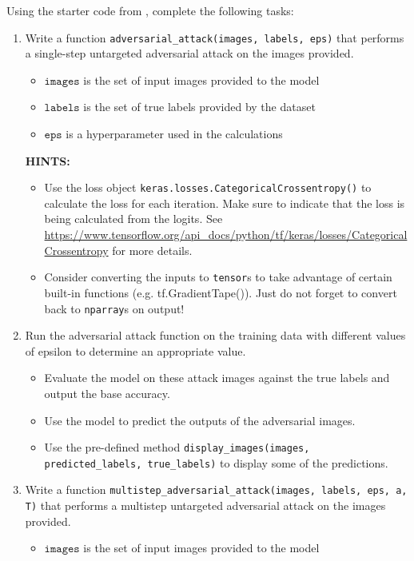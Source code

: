 \documentclass{article}
\begin{document}
Using the starter code from , complete the following tasks:
\begin{enumerate}
    \item Write a function \texttt{adversarial\_attack(images, labels, eps)} that performs a single-step untargeted adversarial attack on the images provided.
    \begin{itemize}
        \item $\texttt{images}$ is the set of input images provided to the model
        \item $\texttt{labels}$ is the set of true labels provided by the dataset
        \item $\texttt{eps}$ is a hyperparameter used in the calculations
    \end{itemize}
    \textbf{HINTS:}
    \begin{itemize}
        \item Use the loss object \texttt{keras.losses.CategoricalCrossentropy()} to calculate the loss for each iteration. Make sure to indicate that the loss is being calculated from the logits. See \url{https://www.tensorflow.org/api_docs/python/tf/keras/losses/CategoricalCrossentropy} for more details.
        \item Consider converting the inputs to \texttt{tensor}s to take advantage of certain built-in functions (e.g. tf.GradientTape()). Just do not forget to convert back to \texttt{nparray}s on output!
    \end{itemize}
    \item Run the adversarial attack function on the training data with different values of epsilon to determine an appropriate value.
    \begin{itemize}
        \item Evaluate the model on these attack images against the true labels and output the base accuracy. 
        \item Use the model to predict the outputs of the adversarial images.
        \item Use the pre-defined method \texttt{display\_images(images, predicted\_labels, true\_labels)} to display some of the predictions.
    \end{itemize}
    \item Write a function \texttt{multistep\_adversarial\_attack(images, labels, eps, a, T)} that performs a multistep untargeted adversarial attack on the images provided.
    \begin{itemize}
        \item $\texttt{images}$ is the set of input images provided to the model

\end{itemize}
\end{enumerate}
\end{document}
